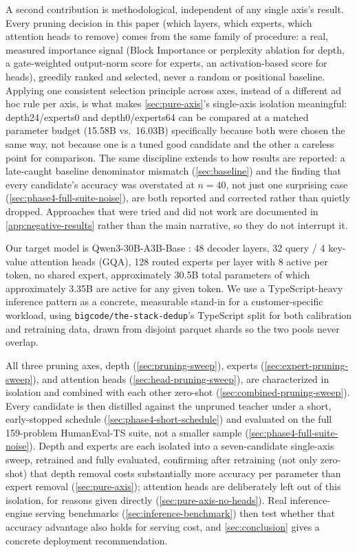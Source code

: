 \documentclass{article}
\theoremstyle{plain}
\theoremstyle{definition}
\theoremstyle{remark}
\begin{document}
A second contribution is methodological, independent of any single
axis's result. Every pruning decision in this paper (which layers,
which experts, which attention heads to remove) comes from the same
family of procedure: a real, measured importance signal (Block
Importance or perplexity ablation for depth, a gate-weighted output-norm
score for experts, an activation-based score for heads), greedily ranked
and selected, never a random or positional baseline. Applying one
consistent selection principle across axes, instead of a different ad
hoc rule per axis, is what makes \cref{sec:pure-axis}'s single-axis
isolation meaningful: depth24/experts0 and depth0/experts64 can be
compared at a matched parameter budget (15.58B vs.\ 16.03B) specifically
because both were
chosen the same way, not because one is a tuned good candidate and the
other a careless point for comparison. The same discipline extends to
how results are reported: a late-caught baseline denominator mismatch
(\cref{sec:baseline}) and the finding that every candidate's accuracy
was overstated at $n{=}40$, not just one surprising case
(\cref{sec:phase4-full-suite-noise}), are both reported and corrected
rather than quietly dropped. Approaches that were tried and did not work
are documented in \cref{app:negative-results} rather than the main
narrative, so they do not interrupt it.

Our target model is Qwen3-30B-A3B-Base
\cite{qwen3moe}: 48 decoder layers, 32 query / 4 key-value attention heads
(GQA), 128 routed experts per layer with 8 active per token, no shared
expert, approximately 30.5B total parameters of which approximately 3.35B
are active for any given token. We use a TypeScript-heavy inference
pattern as a concrete, measurable stand-in for a customer-specific
workload, using \texttt{bigcode/the-stack-dedup}'s TypeScript split
\cite{stackdedup} for both calibration and retraining data, drawn from
disjoint parquet shards so the two pools never overlap.

All three pruning axes, depth
(\cref{sec:pruning-sweep}), experts (\cref{sec:expert-pruning-sweep}), and
attention heads (\cref{sec:head-pruning-sweep}), are characterized in
isolation and combined with each other zero-shot
(\cref{sec:combined-pruning-sweep}). Every candidate is then distilled
against the unpruned teacher under a short, early-stopped schedule
(\cref{sec:phase4-short-schedule}) and evaluated on the full 159-problem
HumanEval-TS suite, not a smaller sample
(\cref{sec:phase4-full-suite-noise}). Depth and experts are each isolated
into a seven-candidate single-axis sweep, retrained and fully evaluated,
confirming after retraining (not only zero-shot) that depth removal
costs substantially more accuracy per parameter than expert removal
(\cref{sec:pure-axis}); attention heads are deliberately left out of this
isolation, for reasons given directly (\cref{sec:pure-axis-no-heads}).
Real inference-engine serving benchmarks (\cref{sec:inference-benchmark})
then test whether that accuracy advantage also holds for serving cost,
and \cref{sec:conclusion} gives a concrete deployment recommendation.
\end{document}
